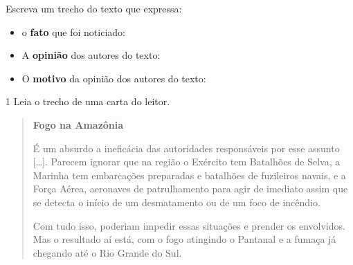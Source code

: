 \begin{escolha}
\begin{escolha}
\begin{escolha}
{{\begin{quote}
\end{quote}

\begin{escolha}
\item Escreva um trecho do texto que expressa:


\begin{itemize}
\item o \textbf{fato} que foi noticiado: 

\item A \textbf{opinião} dos autores do texto: 
  
\item O \textbf{motivo} da opinião dos autores do texto: 
\end{itemize}

\end{escolha}


\num{1} Leia o trecho de uma carta do leitor.

\begin{quote}
\textbf{Fogo na Amazônia}

É um absurdo a ineficácia das autoridades responsáveis por esse assunto
{[}\ldots{}{]}. Parecem ignorar que na região o Exército tem Batalhões
de Selva, a Marinha tem embarcações preparadas e batalhões de fuzileiros
navais, e a Força Aérea, aeronaves de patrulhamento para agir de
imediato assim que se detecta o início de um desmatamento ou de um foco
de incêndio.

Com tudo isso, poderiam impedir essas situações e prender os envolvidos.
Mas o resultado aí está, com o fogo atingindo o Pantanal e a fumaça já
chegando até o Rio Grande do Sul.


\end{quote}}}
\end{escolha}
\end{escolha}
\end{escolha}
